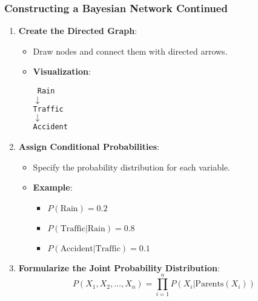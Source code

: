 \documentclass[aspectratio=169]{beamer}
\begin{document}
\begin{frame}[fragile]
    \frametitle{Constructing a Bayesian Network Continued}
    \begin{enumerate}[resume]
        \item \textbf{Create the Directed Graph}:
            \begin{itemize}
                \item Draw nodes and connect them with directed arrows.
                \item \textbf{Visualization}:
                \begin{center}
                \texttt{
                Rain\\
                $\downarrow$\\
                Traffic\\
                $\downarrow$\\
                Accident
                }
                \end{center}
            \end{itemize}
        
        \item \textbf{Assign Conditional Probabilities}:
            \begin{itemize}
                \item Specify the probability distribution for each variable.
                \item \textbf{Example}:
                \begin{itemize}
                    \item $P(\text{Rain}) = 0.2$
                    \item $P(\text{Traffic} | \text{Rain}) = 0.8$
                    \item $P(\text{Accident} | \text{Traffic}) = 0.1$
                \end{itemize}
            \end{itemize}
        
        \item \textbf{Formularize the Joint Probability Distribution}:
            \begin{equation}
            P(X_1, X_2, \ldots, X_n) = \prod_{i=1}^n P(X_i | \text{Parents}(X_i))
            \end{equation}
    \end{enumerate}
\end{frame}
\end{document}
